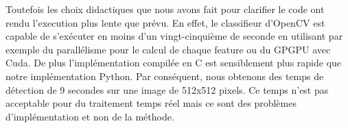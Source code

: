 \documentclass[a4paper,11pt]{report}
\begin{document}
	Toutefois les choix didactiques que nous avons fait pour clarifier le code ont rendu l’execution plus lente que prévu. En effet, le classifieur d’OpenCV est capable de s’exécuter en moins d’un vingt-cinquième de seconde en utilisant par exemple du parallélisme pour le calcul de chaque feature ou du GPGPU avec Cuda. De plus l’implémentation compilée en C est sensiblement plus rapide que notre implémentation Python. Par conséquent, nous obtenons des temps de détection de 9 secondes sur une image de 512x512 pixels. Ce temps n’est pas acceptable pour du traitement temps réel mais ce sont des problèmes d’implémentation et non de la méthode.
\end{document}
